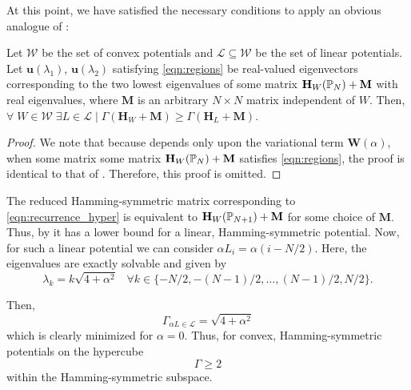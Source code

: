     At this point, we have satisfied the necessary conditions to apply an obvious analogue of :
    \begin{lem}\label{lem:lavine2}
	Let $\mathcal{W}$ be the set of convex potentials and $\mathcal{L}\subseteq{\mathcal{W}}$ be the set of linear potentials. Let $\mathbf{u}(\lambda_1)$, $\mathbf{u}(\lambda_2)$ satisfying \cref{eqn:regions} be real-valued eigenvectors corresponding to the two lowest eigenvalues of some matrix $\mathbf{H}_{W}(\mathbb{P}_{N}) + \mathbf{M}$ with real eigenvalues, where $\mathbf{M}$ is an arbitrary $N\times N$ matrix independent of $W$. Then, $\forall \;W\in\mathcal{W} \; \exists L \in \mathcal{L} \;\rvert\; \Gamma(\mathbf{H}_{W}+\mathbf{M}) \geq \Gamma(\mathbf{H}_{L}+\mathbf{M})$.
  \end{lem}
  \begin{proof}
  	We note that because  depends only upon the variational term $\mathbf{W}(\alpha)$, when some matrix some matrix $\mathbf{H}_{W}(\mathbb{P}_{N}) + \mathbf{M}$ satisfies \cref{eqn:regions}, the proof is identical to that of . Therefore, this proof is omitted.
  \end{proof}
   The reduced Hamming-symmetric matrix corresponding to \cref{eqn:recurrence_hyper} is equivalent to $\mathbf{H}_{W}(\mathbb{P}_{N+1}) + \mathbf{M}$ for some choice of $\mathbf{M}$. Thus, by  it has a lower bound for a linear, Hamming-symmetric potential.  Now, for such a linear potential we can consider $\alpha L_i = \alpha (i-N/2)$. Here, the eigenvalues are exactly solvable and given by
    \begin{equation}
    	\lambda_k = k\sqrt{4+\alpha^2} \;\;\; \text{$\forall k \in \{-N/2,-(N-1)/2,\dots,(N-1)/2,N/2\}$.}
    \end{equation}

    Then,
    \begin{equation}
    	\Gamma_{\alpha L \in \mathcal{L}} = \sqrt{4+\alpha^2}
    \end{equation}
    which is clearly minimized for $\alpha=0$. Thus, for convex, Hamming-symmetric potentials on the hypercube
    \begin{equation}
    	\Gamma \geq 2
    \end{equation}
    within the Hamming-symmetric subspace.